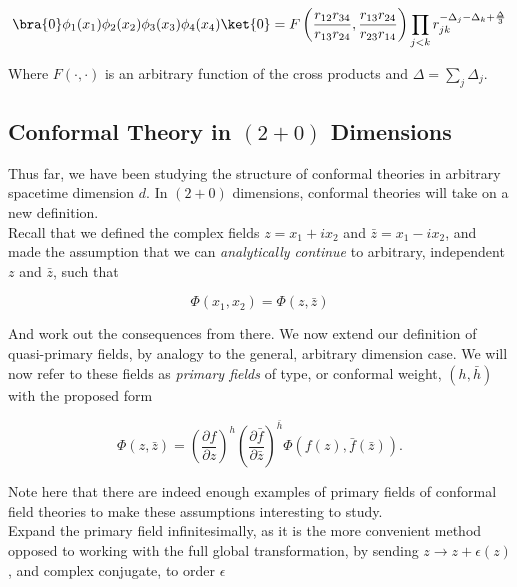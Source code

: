\begin{equation}
\bra{0} \phi_1 (x_1) \phi_2 (x_2) \phi_3 (x_3) \phi_4 (x_4) \ket{0} = F \left( \frac{r_{12} r_{34}}{r_{13} r_{24}}, \frac{r_{13} r_{24}}{r_{23} r_{14}} \right) \prod_{j<k} r_{jk}^{-\Delta_j - \Delta_k + \frac{\Delta}{3}}
\end{equation}

\noindent Where $F(\cdot,\cdot)$ is an arbitrary function of the cross products and $\Delta = \sum_j \Delta_j$.

\subsection*{Conformal Theory in $(2+0)$ Dimensions}

\noindent Thus far, we have been studying the structure of conformal theories in arbitrary spacetime dimension $d$. In $(2+0)$ dimensions, conformal theories will take on a new definition. \\

\noindent Recall that we defined the complex fields $z = x_1 + i x_2$ and $\bar{z} = x_1 - i x_2$, and made the assumption that we can \textit{analytically continue} to arbitrary, independent $z$ and $\bar{z}$, such that

\begin{equation}
\Phi(x_1,x_2) = \Phi(z,\bar{z})
\end{equation}

\noindent And work out the consequences from there. We now extend our definition of quasi-primary fields, by analogy to the general, arbitrary dimension case. We will now refer to these fields as \textit{primary fields} of type, or conformal weight, $(h, \bar{h})$ with the proposed form

\begin{equation}
\Phi (z, \bar{z}) = \left( \frac{\partial f}{\partial z} \right)^h \left( \frac{\partial \bar{f}}{\partial \bar{z}} \right)^{\bar{h}} \Phi (f(z), \bar{f} (\bar{z})).
\end{equation}

\noindent Note here that there are indeed enough examples of primary fields of conformal field theories to make these assumptions interesting to study. \\

\noindent Expand the primary field infinitesimally, as it is the more convenient method opposed to working with the full global transformation, by sending $z \rightarrow z + \epsilon(z)$, and complex conjugate, to order $\epsilon$

